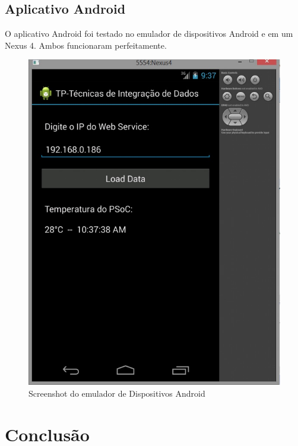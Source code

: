 \documentclass[a4paper,12pt,titlepage]{article}
\begin{document}
	
	\subsection{Aplicativo Android}
	O aplicativo Android foi testado no emulador de dispositivos Android e em um Nexus 4. Ambos funcionaram perfeitamente.
	
		\begin{figure}[h!]
			\centering
			\includegraphics[width=0.4\linewidth]{appemulador}
			\caption{Screenshot do emulador de Dispositivos Android}
			\label{fig:emulador}
		\end{figure}
		

\section{Conclusão}
\end{document}
